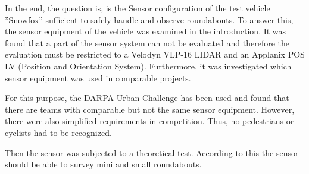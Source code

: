 \documentclass[11pt,oneside,openright]{mpreport}
\begin{document}

In the end, the question is, is the Sensor configuration of the test vehicle ''Snowfox'' sufficient to safely handle
and observe roundabouts. To answer this, the sensor equipment of the vehicle was examined in the introduction.
It was found that a part of the sensor system can not be evaluated and therefore the evaluation must be restricted
to a Velodyn VLP-16 LIDAR and an Applanix POS LV (Position and Orientation System).
Furthermore, it was investigated which sensor equipment was used in comparable projects.

For this purpose, the \ac{DARPA} Urban Challenge has been used and found that there are teams
with comparable but not the same sensor equipment.
However, there were also simplified requirements in competition.
Thus, no pedestrians or cyclists had to be recognized.

Then the sensor was subjected to a theoretical test. According to this the sensor
should be able to survey mini and small roundabouts.
\end{document}
